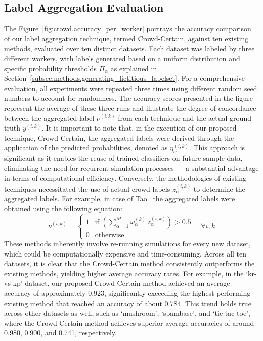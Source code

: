 \documentclass[default]{bst/sn-jnl_mine}%
\begin{document}
\subsection{Label Aggregation Evaluation}
The Figure~\ref{fig:crowd.accuracy_per_worker} portrays the accuracy comparison of our label aggregation technique, termed Crowd-Certain, against ten existing methods, evaluated over ten distinct datasets. Each dataset was labeled by three different workers, with labels generated based on a uniform distribution and specific probability thresholds $\Pi_\alpha$ as explained in Section~\ref{subsec:methods.generating_fictitious_labelset}.
For a comprehensive evaluation, all experiments were repeated three times using different random seed numbers to account for randomness. The accuracy scores presented in the figure represent the average of these three runs and illustrate the degree of concordance between the aggregated label $\nu^{(i,k)}$ from each technique and the actual ground truth $y^{(i,k)}$.
It is important to note that, in the execution of our proposed technique, Crowd-Certain, the aggregated labels were derived through the application of the predicted probabilities, denoted as $\eta_{\alpha}^{(i,k)}$. This approach is significant as it enables the reuse of trained classifiers on future sample data, eliminating the need for recurrent simulation processes --- a substantial advantage in terms of computational efficiency. Conversely, the methodologies of existing techniques necessitated the use of actual crowd labels $z_\alpha^{(i,k)}$ to determine the aggregated labels. For example, in case of Tao~\cite{tao_Label_2020} the aggregated labels were obtained using the following equation:
\begin{equation}
    \nu^{(i,k)} =
    \begin{cases}
        1 & \text{if } \left(\sum_{\alpha=1}^{M} \omega_{\alpha}^{(k)}\, z_{\alpha}^{(i,k)}\right) > 0.5 \\
        0 & \text{otherwise}
    \end{cases}
    \quad \forall i, k
    \label{eq:crowd.aggregated_label_benchmarks}
\end{equation}
These methods inherently involve re-running simulations for every new dataset, which could be computationally expensive and time-consuming. Across all ten datasets, it is clear that the Crowd-Certain method consistently outperforms the existing methods, yielding higher average accuracy rates. For example, in the `kr-vs-kp' dataset, our proposed Crowd-Certain method achieved an average accuracy of approximately 0.923, significantly exceeding the highest-performing existing method that reached an accuracy of about 0.784. This trend holds true across other datasets as well, such as `mushroom', `spambase', and `tic-tac-toe', where the Crowd-Certain method achieves superior average accuracies of around 0.980, 0.900, and 0.741, respectively.
\end{document}
